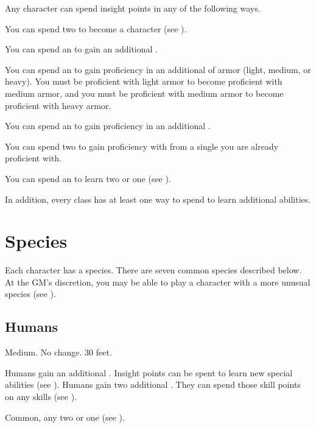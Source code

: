     Any character can spend insight points in any of the following ways.
    \begin{raggeditemize}
        \item You can spend two  to become a  character (see ).
        \item You can spend an  to gain an additional .
        \item You can spend an  to gain proficiency in an additional  of armor (light, medium, or heavy).
            You must be proficient with light armor to become proficient with medium armor, and you must be proficient with medium armor to become proficient with heavy armor.
        \item You can spend an  to gain proficiency in an additional .
        \item You can spend two  to gain proficiency with  from a single  you are already proficient with.
        \item You can spend an  to learn two  or one  (see ).
    \end{raggeditemize}
    In addition, every class has at least one way to spend  to learn additional abilities.

\section{Species}\label{Species}
    Each character has a species.
    There are seven common species described below.
    At the GM's discretion, you may be able to play a character with a more unusual species (see ).

    \subsection{Humans}
         Medium.
         No change.
         30 feet.
        \begin{raggeditemize}
             Humans gain an additional .
                Insight points can be spent to learn new special abilities (see ).
             Humans gain two additional . They can spend those skill points on any skills (see ).
        \end{raggeditemize}
         Common, any two  or one  (see ).

